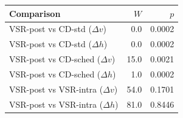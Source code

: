 \begin{tabular}{lrr}
\toprule
Comparison & $W$ & $p$ \\
\midrule
VSR-post vs CD-std ($\Delta v$) & 0.0 & 0.0002 \\
VSR-post vs CD-std ($\Delta h$) & 0.0 & 0.0002 \\
VSR-post vs CD-sched ($\Delta v$) & 15.0 & 0.0021 \\
VSR-post vs CD-sched ($\Delta h$) & 1.0 & 0.0002 \\
VSR-post vs VSR-intra ($\Delta v$) & 54.0 & 0.1701 \\
VSR-post vs VSR-intra ($\Delta h$) & 81.0 & 0.8446 \\
\bottomrule
\end{tabular}
